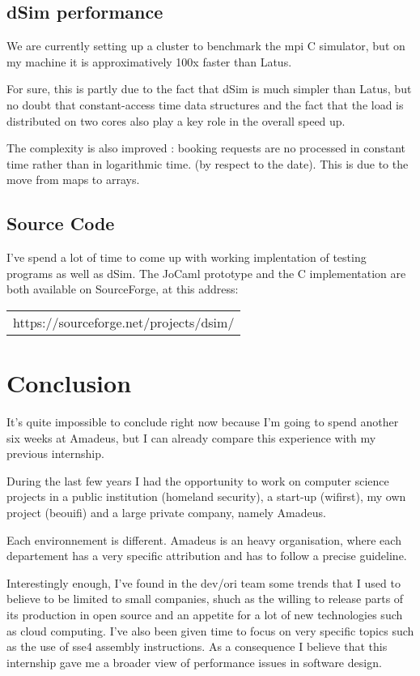 \documentclass[11pt]{JHEP3}
\begin{document}
\subsection{dSim performance}

We are currently setting up a cluster to benchmark the mpi C simulator, but on my machine it is approximatively 100x faster than Latus.

For sure, this is partly due to the fact that dSim is much simpler than Latus, but no doubt that constant-access time data structures and the fact that the load is distributed on two cores also play a key role in the overall speed up.



The complexity is also improved : booking requests are no processed in constant time rather than in logarithmic time. (by respect to the date). This is due to the move from maps to arrays. 



\subsection{Source Code}

I've spend a lot of time to come up with working implentation of testing programs as well as dSim. The JoCaml prototype and the C implementation are both available on SourceForge, at this address: 

\begin{tabular}{c}
https://sourceforge.net/projects/dsim/
\end{tabular}

\newpage
\section{Conclusion}

It's quite impossible to conclude right now because I'm going to spend another six weeks at Amadeus, but I can already compare this experience with my previous internship.

During the last few years I had the opportunity to work on computer science projects in a public institution (homeland security), a start-up (wifirst), my own project (beouifi) and a large private company, namely Amadeus. 

Each environnement is different. Amadeus is an heavy organisation, where each departement has a very specific attribution and has to follow a precise guideline. 

Interestingly enough, I've found in the dev/ori team some trends that I used to believe to be limited to small companies, shuch as the willing to release parts of its production in open source and an appetite for a lot of new technologies such as cloud computing. I've also been given time to focus on very specific topics such as the use of sse4 assembly instructions. As a consequence I believe that this internship gave me a broader view of performance issues in software design.
\end{document}
